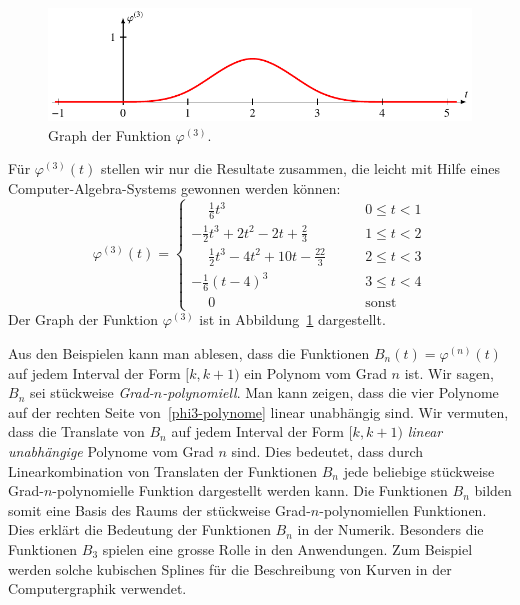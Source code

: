 \begin{beispiel}
\begin{figure}
\centering
\includegraphics{chapters/9-spline/images/phi3.pdf}
\caption{Graph der Funktion $\varphi^{(3)}$.
\label{spline:phi3}}
\end{figure}
Für $\varphi^{(3)}(t)$ stellen wir nur die Resultate
zusammen, die leicht mit Hilfe eines Computer-Algebra-Systems
gewonnen werden können:
\begin{equation}
\varphi^{(3)}(t)
=
\begin{cases}
\displaystyle
\phantom{-}
\frac16t^3
&\qquad
0\le t<1
\\[9pt]
\displaystyle
-\frac12t^3+2t^2-2t+\frac23
&\qquad
1\le t<2
\\[9pt]
\displaystyle
\phantom{-}
\frac12t^3-4t^2+10t-\frac{22}3
&\qquad
2\le t<3
\\[9pt]
\displaystyle
-\frac16(t-4)^3
&\qquad
3\le t<4
\\[9pt]
\displaystyle
\phantom{-}
0&\qquad\text{sonst}
\end{cases}
\label{phi3-polynome}
\end{equation}
Der Graph der Funktion $\varphi^{(3)}$ ist in Abbildung~\ref{spline:phi3}
dargestellt.
\end{beispiel}

Aus den Beispielen kann man ablesen, dass die Funktionen
$B_n(t)=\varphi^{(n)}(t)$ auf jedem Interval der Form $[k,k+1)$ 
ein Polynom vom Grad $n$ ist.
Wir sagen, $B_n$ sei stückweise {\em Grad-$n$-polynomiell}.
Man kann zeigen, dass die vier Polynome auf der rechten
Seite von~\eqref{phi3-polynome} linear unabhängig sind.
Wir vermuten, dass die Translate von $B_n$ auf jedem Interval der Form
$[k,k+1)$ {\em linear unabhängige} Polynome vom Grad $n$ sind.
Dies bedeutet, dass durch Linearkombination von Translaten der
Funktionen $B_n$ jede beliebige stückweise Grad-$n$-polynomielle
Funktion dargestellt werden kann.
Die Funktionen $B_n$ bilden somit eine Basis des Raums der stückweise 
Grad-$n$-polynomiellen Funktionen.
Dies erklärt die Bedeutung der Funktionen $B_n$ in der Numerik.
Besonders die Funktionen $B_3$ spielen eine grosse Rolle in den
Anwendungen.
Zum Beispiel werden solche kubischen Splines für die Beschreibung
von Kurven in der Computergraphik verwendet.

